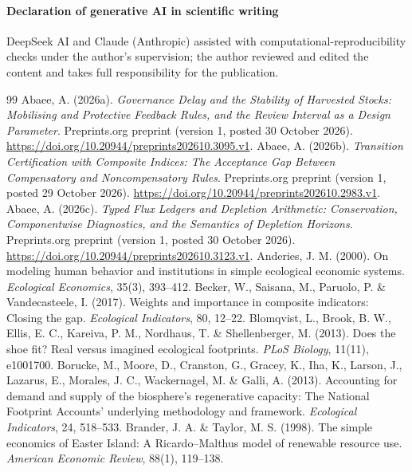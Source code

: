 \documentclass[preprint,12pt,authoryear]{elsarticle}
\begin{document}
\paragraph{Declaration of generative AI in scientific writing} DeepSeek AI and Claude (Anthropic) assisted with computational-reproducibility checks under the author's supervision; the author reviewed and edited the content and takes full responsibility for the publication.
\begin{thebibliography}{99}
 Abaee, A. (2026a). \emph{Governance Delay and the Stability of Harvested Stocks: Mobilising and Protective Feedback Rules, and the Review Interval as a Design Parameter}. Preprints.org preprint (version 1, posted 30 October 2026). \url{https://doi.org/10.20944/preprints202610.3095.v1}.
 Abaee, A. (2026b). \emph{Transition Certification with Composite Indices: The Acceptance Gap Between Compensatory and Noncompensatory Rules}. Preprints.org preprint (version 1, posted 29 October 2026). \url{https://doi.org/10.20944/preprints202610.2983.v1}.
 Abaee, A. (2026c). \emph{Typed Flux Ledgers and Depletion Arithmetic: Conservation, Componentwise Diagnostics, and the Semantics of Depletion Horizons}. Preprints.org preprint (version 1, posted 30 October 2026). \url{https://doi.org/10.20944/preprints202610.3123.v1}.
 Anderies, J. M. (2000). On modeling human behavior and institutions in simple ecological economic systems. \emph{Ecological Economics}, 35(3), 393--412.
 Becker, W., Saisana, M., Paruolo, P. \& Vandecasteele, I. (2017). Weights and importance in composite indicators: Closing the gap. \emph{Ecological Indicators}, 80, 12--22.
 Blomqvist, L., Brook, B. W., Ellis, E. C., Kareiva, P. M., Nordhaus, T. \& Shellenberger, M. (2013). Does the shoe fit? Real versus imagined ecological footprints. \emph{PLoS Biology}, 11(11), e1001700.
 Borucke, M., Moore, D., Cranston, G., Gracey, K., Iha, K., Larson, J., Lazarus, E., Morales, J. C., Wackernagel, M. \& Galli, A. (2013). Accounting for demand and supply of the biosphere's regenerative capacity: The National Footprint Accounts' underlying methodology and framework. \emph{Ecological Indicators}, 24, 518--533.
 Brander, J. A. \& Taylor, M. S. (1998). The simple economics of Easter Island: A Ricardo--Malthus model of renewable resource use. \emph{American Economic Review}, 88(1), 119--138.

\end{thebibliography}
\end{document}
